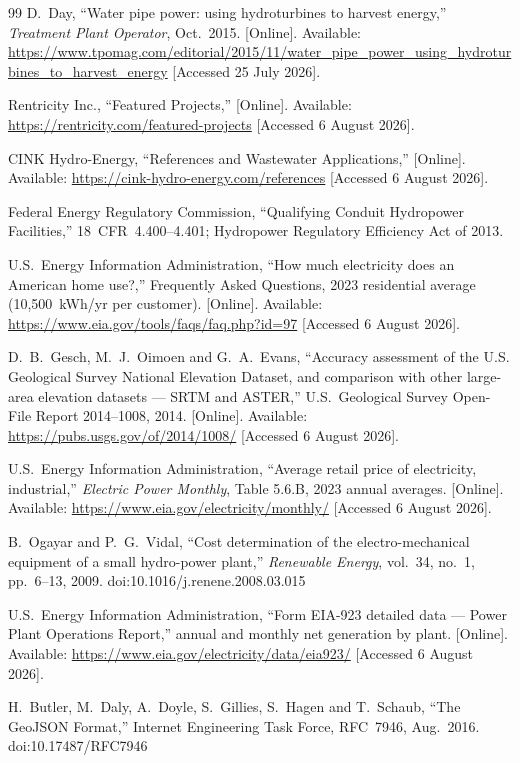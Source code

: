 \documentclass[12pt,letterpaper]{report}
\begin{document}
\begin{thebibliography}{99}
D.~Day,
``Water pipe power: using hydroturbines to harvest energy,''
\emph{Treatment Plant Operator}, Oct.\ 2015.
[Online]. Available:
\url{https://www.tpomag.com/editorial/2015/11/water_pipe_power_using_hydroturbines_to_harvest_energy}
[Accessed 25 July 2026].

Rentricity Inc.,
``Featured Projects,''
[Online]. Available: \url{https://rentricity.com/featured-projects}
[Accessed 6 August 2026].

CINK Hydro-Energy,
``References and Wastewater Applications,''
[Online]. Available: \url{https://cink-hydro-energy.com/references}
[Accessed 6 August 2026].

Federal Energy Regulatory Commission,
``Qualifying Conduit Hydropower Facilities,''
18~CFR~4.400--4.401; Hydropower Regulatory Efficiency Act of 2013.

U.S.\ Energy Information Administration,
``How much electricity does an American home use?,'' Frequently Asked Questions,
2023 residential average (10,500~kWh/yr per customer).
[Online]. Available: \url{https://www.eia.gov/tools/faqs/faq.php?id=97}
[Accessed 6 August 2026].

D.~B.~Gesch, M.~J.~Oimoen and G.~A.~Evans,
``Accuracy assessment of the U.S. Geological Survey National Elevation Dataset,
and comparison with other large-area elevation datasets --- SRTM and ASTER,''
U.S.\ Geological Survey Open-File Report 2014--1008, 2014.
[Online]. Available: \url{https://pubs.usgs.gov/of/2014/1008/}
[Accessed 6 August 2026].

U.S.\ Energy Information Administration,
``Average retail price of electricity, industrial,''
\emph{Electric Power Monthly}, Table 5.6.B, 2023 annual averages.
[Online]. Available: \url{https://www.eia.gov/electricity/monthly/}
[Accessed 6 August 2026].

B.~Ogayar and P.~G.~Vidal,
``Cost determination of the electro-mechanical equipment of a small hydro-power plant,''
\emph{Renewable Energy}, vol.~34, no.~1, pp.~6--13, 2009.
doi:10.1016/j.renene.2008.03.015

U.S.\ Energy Information Administration,
``Form EIA-923 detailed data --- Power Plant Operations Report,''
annual and monthly net generation by plant.
[Online]. Available: \url{https://www.eia.gov/electricity/data/eia923/}
[Accessed 6 August 2026].

H.~Butler, M.~Daly, A.~Doyle, S.~Gillies, S.~Hagen and T.~Schaub,
``The GeoJSON Format,'' Internet Engineering Task Force, RFC~7946, Aug.\ 2016.
doi:10.17487/RFC7946


\end{thebibliography}
\end{document}
